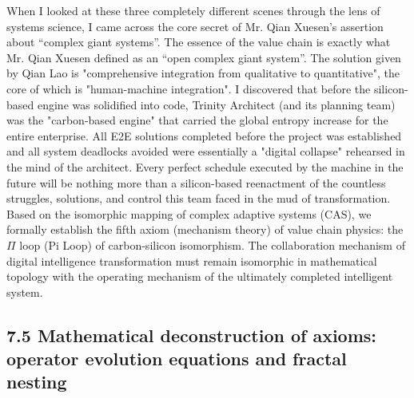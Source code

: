 \documentclass[11pt,a4paper]{article}
\begin{document}
When I looked at these three completely different scenes through the lens of systems science, I came across the core secret of Mr. Qian Xuesen’s assertion about “complex giant systems”. The essence of the value chain is exactly what Mr. Qian Xuesen defined as an “open complex giant system”. The solution given by Qian Lao is "comprehensive integration from qualitative to quantitative", the core of which is "human-machine integration". I discovered that before the silicon-based engine was solidified into code, Trinity Architect (and its planning team) was the "carbon-based engine" that carried the global entropy increase for the entire enterprise. All E2E solutions completed before the project was established and all system deadlocks avoided were essentially a "digital collapse" rehearsed in the mind of the architect. Every perfect schedule executed by the machine in the future will be nothing more than a silicon-based reenactment of the countless struggles, solutions, and control this team faced in the mud of transformation. Based on the isomorphic mapping of complex adaptive systems (CAS), we formally establish the fifth axiom (mechanism theory) of value chain physics: the $\Pi$ loop (Pi Loop) of carbon-silicon isomorphism. The collaboration mechanism of digital intelligence transformation must remain isomorphic in mathematical topology with the operating mechanism of the ultimately completed intelligent system.


\subsection*{7.5 Mathematical deconstruction of axioms: operator evolution equations and fractal nesting}
\end{document}
